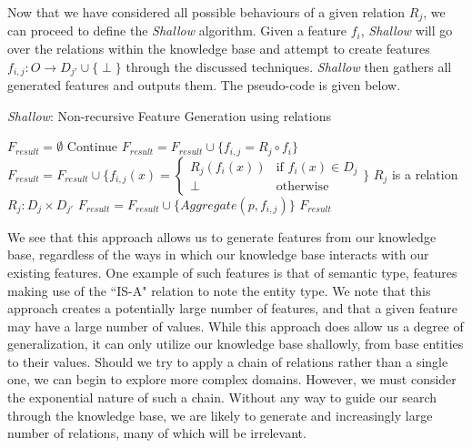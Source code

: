 \documentclass[twoside,11pt]{article}
\theoremstyle{definition}
\begin{document}
Now that we have considered all possible behaviours of a given relation $R_j$, we can proceed to define the \emph{Shallow} algorithm. Given a feature $f_i$, \emph{Shallow} will go over the relations within the knowledge base and attempt to create features $f_{i,j}:O\rightarrow D_{j'}\cup\{\perp\}$ through the discussed techniques. \emph{Shallow} then gathers all generated features and outputs them. The pseudo-code is given below.

\begin{algorithm}[H]
	\caption{\emph{Shallow}: Non-recursive Feature Generation using relations}
	\label{code-compete}
	\small
	\begin{algorithmic}
		\State $F_{result}=\emptyset$
			\State Continue
			\State $F_{result}=F_{result}\cup \{f_{i,j}=R_j\circ f_i\}$
			\State $F_{result}=F_{result}\cup \{f_{i,j}(x)=\begin{cases} R_j( f_i(x)) &\mbox{if } f_i(x)\in D_j\\ 
			\perp & \mbox{otherwise } \end{cases}\}$
		\Else \Comment $R_j$ is a relation $R_j:D_j\times D_{j'}$
		\State $F_{result}=F_{result}\cup \{Aggregate(p,f_{i,j})\}$
		\EndIf
		\EndFor
		\EndFor
		\State \Return $F_{result}$ 
		\EndFunction
		
	\end{algorithmic}
\end{algorithm}

We see that this approach allows us to generate features from our knowledge base, regardless of the ways in which our knowledge base interacts with our existing features. One example of such features is that of semantic type, features making use of the ``IS-A" relation to note the entity type. We note that this approach creates a potentially large number of features, and that a given feature may have a large number of values. While this approach does allow us a degree of generalization, it can only utilize our knowledge base shallowly, from base entities to their values. 
Should we try to apply a chain of relations rather than a single one, we can begin to explore more complex domains. However, we must consider the exponential nature of such a chain. Without any way to guide our search through the knowledge base, we are likely to generate and increasingly large number of relations, many of which will be irrelevant. 
\end{document}
